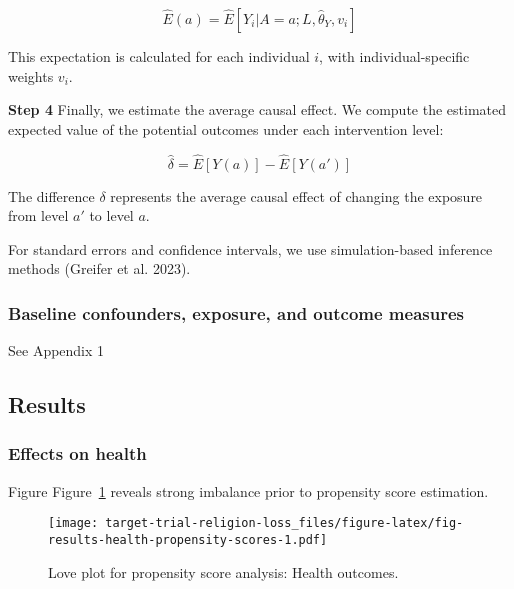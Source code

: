 \documentclass[
  letterpaper,
  DIV=11,
  numbers=noendperiod]{scrartcl}
\begin{document}
\[\hat{E}(a) = \hat{E}[Y_i|A=a; L,\hat{\theta}_Y, v_i]\]

This expectation is calculated for each individual \(i\), with
individual-specific weights \(v_i\).

\textbf{Step 4} Finally, we estimate the average causal effect. We
compute the estimated expected value of the potential outcomes under
each intervention level:

\[\hat{\delta} = \hat{E}[Y(a)] - \hat{E}[Y(a')]\]

The difference \(\delta\) represents the average causal effect of
changing the exposure from level \(a'\) to level \(a\).

For standard errors and confidence intervals, we use simulation-based
inference methods (Greifer et al. 2023).

\hypertarget{baseline-confounders-exposure-and-outcome-measures}{%
\subsubsection{Baseline confounders, exposure, and outcome
measures}\label{baseline-confounders-exposure-and-outcome-measures}}

See Appendix 1

\hypertarget{results}{%
\subsection{Results}\label{results}}

\hypertarget{effects-on-health}{%
\subsubsection{Effects on health}\label{effects-on-health}}

Figure Figure~\ref{fig-results-health-propensity-scores} reveals strong
imbalance prior to propensity score estimation.

\begin{figure}

{\centering \texttt{[image: target-trial-religion-loss\_files/figure-latex/fig-results-health-propensity-scores-1.pdf]}

}

\caption{\label{fig-results-health-propensity-scores}Love plot for
propensity score analysis: Health outcomes.}

\end{figure}
\end{document}
